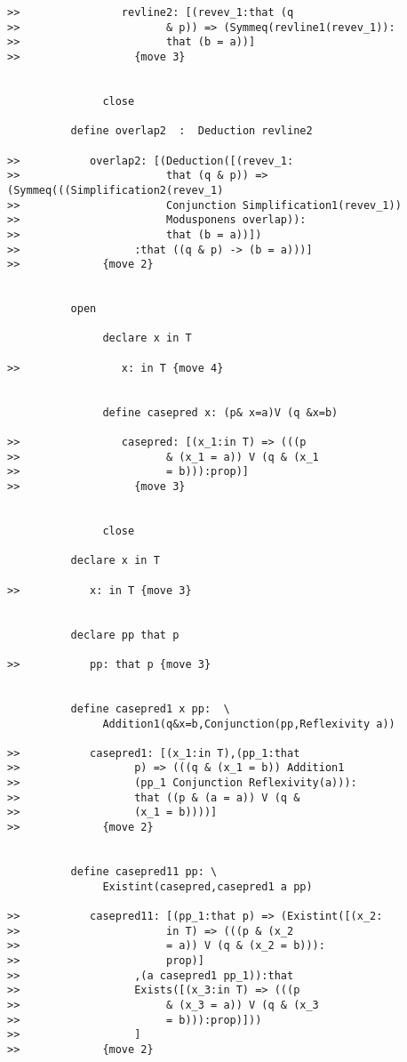 \documentclass[12pt]{article}
\begin{document}
\begin{verbatim}
>>                revline2: [(revev_1:that (q 
>>                       & p)) => (Symmeq(revline1(revev_1)):
>>                       that (b = a))]
>>                  {move 3}


               close

          define overlap2  :  Deduction revline2

>>           overlap2: [(Deduction([(revev_1:
>>                       that (q & p)) => (Symmeq(((Simplification2(revev_1) 
>>                       Conjunction Simplification1(revev_1)) 
>>                       Modusponens overlap)):
>>                       that (b = a))])
>>                  :that ((q & p) -> (b = a)))]
>>             {move 2}


          open 

               declare x in T

>>                x: in T {move 4}


               define casepred x: (p& x=a)V (q &x=b)

>>                casepred: [(x_1:in T) => (((p 
>>                       & (x_1 = a)) V (q & (x_1 
>>                       = b))):prop)]
>>                  {move 3}


               close

          declare x in T

>>           x: in T {move 3}


          declare pp that p

>>           pp: that p {move 3}


          define casepred1 x pp:  \
               Addition1(q&x=b,Conjunction(pp,Reflexivity a))

>>           casepred1: [(x_1:in T),(pp_1:that 
>>                  p) => (((q & (x_1 = b)) Addition1 
>>                  (pp_1 Conjunction Reflexivity(a))):
>>                  that ((p & (a = a)) V (q & 
>>                  (x_1 = b))))]
>>             {move 2}


          define casepred11 pp: \
               Existint(casepred,casepred1 a pp)

>>           casepred11: [(pp_1:that p) => (Existint([(x_2:
>>                       in T) => (((p & (x_2 
>>                       = a)) V (q & (x_2 = b))):
>>                       prop)]
>>                  ,(a casepred1 pp_1)):that 
>>                  Exists([(x_3:in T) => (((p 
>>                       & (x_3 = a)) V (q & (x_3 
>>                       = b))):prop)]))
>>                  ]
>>             {move 2}



\end{verbatim}
\end{document}
